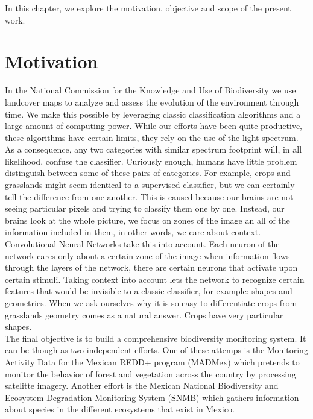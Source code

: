 In this chapter, we explore the motivation, objective and scope of the present work.\\


\section{Motivation}

In the National Commission for the Knowledge and Use of Biodiversity we use landcover maps to analyze and assess the evolution of the environment through time. We make this possible by leveraging classic classification algorithms and a large amount of computing power. While our efforts have been quite productive, these algorithms have certain limits, they rely on the use of the light spectrum. As a consequence, any two categories with similar spectrum footprint will, in all likelihood, confuse the classifier. Curiously enough, humans have little problem distinguish between some of these pairs of categories. For example, crops and grasslands might seem identical to a supervised classifier, but we can certainly tell the difference from one another. This is caused because our brains are not seeing particular pixels and trying to classify them one by one. Instead, our brains look at the whole picture, we focus on zones of the image an all of the information included in them, in other words, we care about context. Convolutional Neural Networks take this into account. Each neuron of the network cares only about a certain zone of the image when information flows through the layers of the network, there are certain neurons that activate upon certain stimuli. Taking context into account lets the network to recognize certain features that would be invisible to a classic classifier, for example: shapes and geometries. When we ask ourselves why it is so easy to differentiate crops from grasslands geometry comes as a natural answer. Crops have very particular shapes.\\

The final objective is to build a comprehensive biodiversity monitoring system. It can be though as two independent efforts. One of these attemps is the Monitoring Activity Data for the Mexican REDD+ program (MADMex) \cite{rs6053923} which pretends to monitor the behavior of forest and vegetation across the country by processing satelitte imagery. Another effort is the Mexican National Biodiversity and Ecosystem Degradation Monitoring System (SNMB) \cite{GARCIAALANIZ201762} which gathers information about species in the different ecosystems that exist in Mexico.\\


